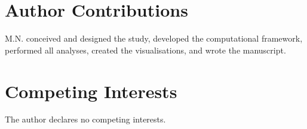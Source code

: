 \documentclass[11pt,a4paper]{article}
\begin{document}
\section*{Author Contributions}

M.N. conceived and designed the study, developed the computational framework, performed all analyses, created the visualisations, and wrote the manuscript.

\section*{Competing Interests}

The author declares no competing interests.

\end{document}
